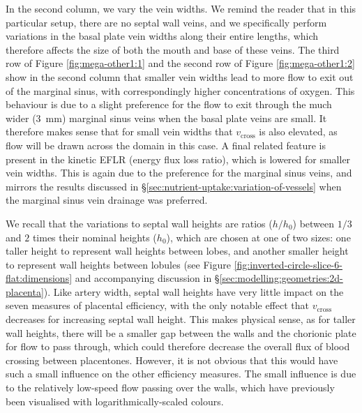             In the second column, we vary the vein widths. We remind the reader that in this particular setup, there are no septal wall veins, and we specifically perform variations in the basal plate vein widths along their entire lengths, which therefore affects the size of both the mouth and base of these veins. The third row of Figure \ref{fig:mega-other1:1} and the second row of Figure \ref{fig:mega-other1:2} show in the second column that smaller vein widths lead to more flow to exit out of the marginal sinus, with correspondingly higher concentrations of oxygen. This behaviour is due to a slight preference for the flow to exit through the much wider (\qty{3}{\milli\metre}) marginal sinus veins when the basal plate veins are small. It therefore makes sense that for small vein widths that $v_\text{cross}$ is also elevated, as flow will be drawn across the domain in this case. A final related feature is present in the kinetic EFLR (energy flux loss ratio), which is lowered for smaller vein widths. This is again due to the preference for the marginal sinus veins, and mirrors the results discussed in \S\ref{sec:nutrient-uptake:variation-of-vessels} when the marginal sinus vein drainage was preferred.

            We recall that the variations to septal wall heights are ratios ($h/h_0$) between $1/3$ and $2$ times their nominal heights ($h_0$), which are chosen at one of two sizes: one taller height to represent wall heights between lobes, and another smaller height to represent wall heights between lobules (see Figure \ref{fig:inverted-circle-slice-6-flat:dimensions} and accompanying discussion in \S\ref{sec:modelling:geometries:2d-placenta}). Like artery width, septal wall heights have very little impact on the seven measures of placental efficiency, with the only notable effect that $v_\text{cross}$ decreases for increasing septal wall height. This makes physical sense, as for taller wall heights, there will be a smaller gap between the walls and the chorionic plate for flow to pass through, which could therefore decrease the overall flux of blood crossing between placentones. However, it is not obvious that this would have such a small influence on the other efficiency measures. The small influence is due to the relatively low-speed flow passing over the walls, which have previously been visualised with logarithmically-scaled colours.

